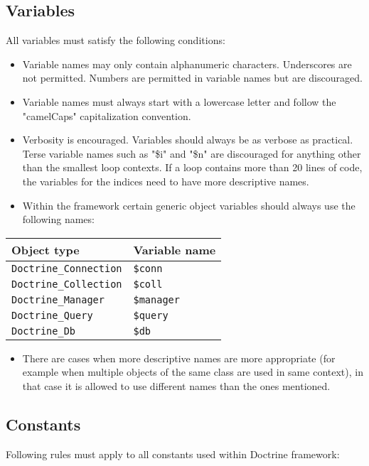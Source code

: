 \documentclass[11pt,a4paper]{report}
\begin{document}
\subsection{Variables}
All variables must satisfy the following conditions:

\begin{itemize}
\item{Variable names may only contain alphanumeric characters. Underscores are not permitted. Numbers are permitted in variable names but are discouraged.}
\item{Variable names must always start with a lowercase letter and follow the "camelCaps" capitalization convention.}
\item{Verbosity is encouraged. Variables should always be as verbose as practical. Terse variable names such as "\$i" and "\$n" are discouraged for anything other than the smallest loop contexts. If a loop contains more than 20 lines of code, the variables for the indices need to have more descriptive names.}
\item{Within the framework certain generic object variables should always use the following names:}
\end{itemize}
\begin{tabular}{|l|l|}
\hline
Object type & Variable name\\
\hline
\texttt{Doctrine\_Connection} & \texttt{\$conn}\\
\hline
\texttt{Doctrine\_Collection} & \texttt{\$coll}\\
\hline
\texttt{Doctrine\_Manager} & \texttt{\$manager}\\
\hline
\texttt{Doctrine\_Query} & \texttt{\$query}\\
\hline
\texttt{Doctrine\_Db} & \texttt{\$db}\\
\hline
\end{tabular}
\begin{itemize}
\item{There are cases when more descriptive names are more appropriate (for example when multiple objects of the same class are used in same context), in that case it is allowed to use different names than the ones mentioned.}
\end{itemize}
\subsection{Constants}
Following rules must apply to all constants used within Doctrine framework:
\end{document}
